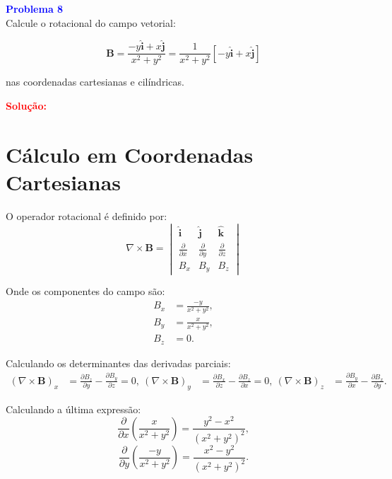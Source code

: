 \documentclass[a4paper,12pt]{article}
\begin{document}
\begin{flushleft}
\textbf{\textcolor{blue}{\Large Problema 8}}\\

Calcule o rotacional do campo vetorial:

\begin{equation}
\mathbf{B} = \frac{-y \hat{\mathbf{i}} + x \hat{\mathbf{j}}}{x^2 + y^2} = \frac{1}{x^2 + y^2}\left[-y \hat{\mathbf{i}} + x \hat{\mathbf{j}}\right]
\end{equation}

nas coordenadas cartesianas e cilíndricas.

\textcolor{red}{\textbf{Solução:}}\\

\section*{Cálculo em Coordenadas Cartesianas}
O operador rotacional é definido por:
\begin{equation}
\nabla \times \mathbf{B} =
\begin{vmatrix}
\hat{\mathbf{i}} & \hat{\mathbf{j}} & \hat{\mathbf{k}} \\
\frac{\partial}{\partial x} & \frac{\partial}{\partial y} & \frac{\partial}{\partial z} \\
B_x & B_y & B_z
\end{vmatrix}
\end{equation}

Onde os componentes do campo  são:
\begin{align}
B_x &= \frac{-y}{x^2 + y^2}, \\
B_y &= \frac{x}{x^2 + y^2}, \\
B_z &= 0.
\end{align}

Calculando os determinantes das derivadas parciais:
\begin{align}
\left(\nabla \times \mathbf{B} \right)_x &= \frac{\partial B_z}{\partial y} - \frac{\partial B_y}{\partial z} = 0, \
\left(\nabla \times \mathbf{B} \right)_y &= \frac{\partial B_x}{\partial z} - \frac{\partial B_z}{\partial x} = 0, \
\left(\nabla \times \mathbf{B} \right)_z &= \frac{\partial B_y}{\partial x} - \frac{\partial B_x}{\partial y}.
\end{align}

Calculando a última expressão:
\begin{equation}
\frac{\partial}{\partial x} \left( \frac{x}{x^2 + y^2} \right) = \frac{y^2 - x^2}{(x^2 + y^2)^2},
\end{equation}
\begin{equation}
\frac{\partial}{\partial y} \left( \frac{-y}{x^2 + y^2} \right) = \frac{x^2 - y^2}{(x^2 + y^2)^2}.
\end{equation}


\end{flushleft}
\end{document}
